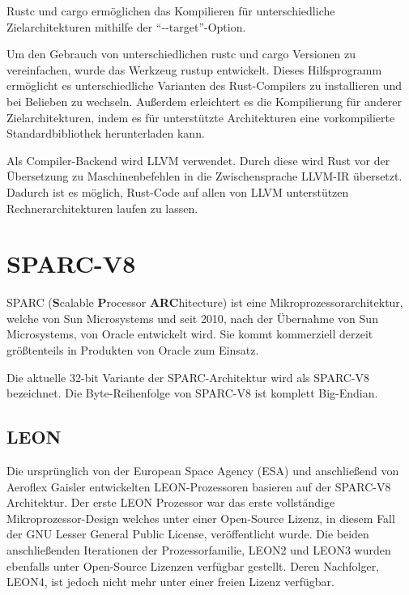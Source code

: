 Rustc und cargo ermöglichen das Kompilieren für unterschiedliche Zielarchitekturen mithilfe der "`-{}-target"'-Option.

Um den Gebrauch von unterschiedlichen rustc und cargo Versionen zu vereinfachen, wurde das Werkzeug rustup entwickelt. Dieses
Hilfsprogramm ermöglicht es unterschiedliche Varianten des Rust-Compilers zu installieren und bei Belieben zu wechseln.
Außerdem erleichtert es die Kompilierung für anderer Zielarchitekturen, indem es für unterstützte Architekturen eine
vorkompilierte Standardbibliothek herunterladen kann.

Als Compiler-Backend wird LLVM verwendet. Durch diese wird Rust vor der Übersetzung zu Maschinenbefehlen in die Zwischensprache
LLVM-IR übersetzt. Dadurch ist es möglich, Rust-Code auf allen von LLVM unterstützen Rechnerarchitekturen laufen zu lassen.


\section{SPARC-V8}

SPARC (\textbf{S}calable \textbf{P}rocessor \textbf{ARC}hitecture) ist eine Mikroprozessorarchitektur, welche von Sun Microsystems und 
seit 2010\cite{sunWikiDe}, nach der Übernahme von Sun Microsystems, von Oracle entwickelt wird\cite{sparcWikiDe}. Sie kommt
kommerziell derzeit größtenteils in Produkten von Oracle zum Einsatz\cite{sparcWikiDe}.

Die aktuelle 32-bit Variante der SPARC-Architektur wird als SPARC-V8 bezeichnet\cite{sparcWikiDe}.
Die Byte-Reihenfolge von SPARC-V8 ist komplett Big-Endian\cite{sparcWikiDe}.

\subsection{LEON}

Die ursprünglich von der European Space Agency (ESA) und anschließend von Aeroflex Gaisler entwickelten LEON-Prozessoren
basieren auf der SPARC-V8 Architektur\cite{leonWikiDe}. 
Der erste LEON Prozessor war das erste vollständige Mikroprozessor-Design welches unter einer
Open-Source Lizenz, in diesem Fall der GNU Lesser General Public License, veröffentlicht wurde\cite{leonWikiDe}.
Die beiden anschließenden Iterationen
der Prozessorfamilie, LEON2 und LEON3 wurden ebenfalls unter Open-Source Lizenzen verfügbar gestellt\cite{leonWikiDe}.
Deren Nachfolger, LEON4, ist jedoch nicht mehr unter einer freien Lizenz verfügbar\cite{leonWikiDe}.

